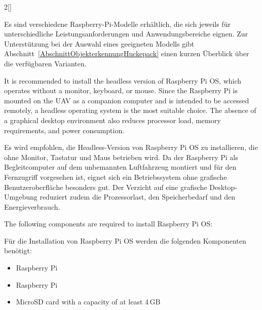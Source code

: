 \begin{paracol}{2}[]
\colger

Es sind verschiedene Raspberry-Pi-Modelle erhältlich, die sich jeweils für unterschiedliche Leistungsanforderungen und Anwendungsbereiche eignen. Zur Unterstützung bei der Auswahl eines geeigneten Modells gibt Abschnitt~\ref{AbschnittObjekterkennungHuckepack} einen kurzen Überblick über die verfügbaren Varianten.

\colende

\renewcommand{\deutschertitel}{Installation von Raspberry Pi OS}
\renewcommand{\englischertitel}{Installing Raspberry Pi OS}
\makrounterabschnitt

It is recommended to install the headless version of Raspberry Pi OS, which operates without a monitor, keyboard, or mouse. Since the Raspberry Pi is mounted on the UAV as a companion computer and is intended to be accessed remotely, a headless operating system is the most suitable choice. The absence of a graphical desktop environment also reduces processor load, memory requirements, and power consumption.

\colger

Es wird empfohlen, die Headless-Version von Raspberry Pi OS zu installieren, die ohne Monitor, Tastatur und Maus betrieben wird. Da der Raspberry Pi als Begleitcomputer auf dem unbemannten Luftfahrzeug montiert und für den Fernzugriff vorgesehen ist, eignet sich ein Betriebssystem ohne grafische Benutzeroberfläche besonders gut. Der Verzicht auf eine grafische Desktop-Umgebung reduziert zudem die Prozessorlast, den Speicherbedarf und den Energieverbrauch.

\coleng

The following components are required to install Raspberry Pi OS:

\colger

Für die Installation von Raspberry Pi OS werden die folgenden Komponenten benötigt:

\coleng

\begin{itemize}
	\item Raspberry Pi
\end{itemize}

\colger

\begin{itemize}
	\item Raspberry Pi
\end{itemize}

\coleng

\begin{itemize}
	\item MicroSD card with a capacity of at least 4\,GB
\end{itemize}


\end{paracol}
